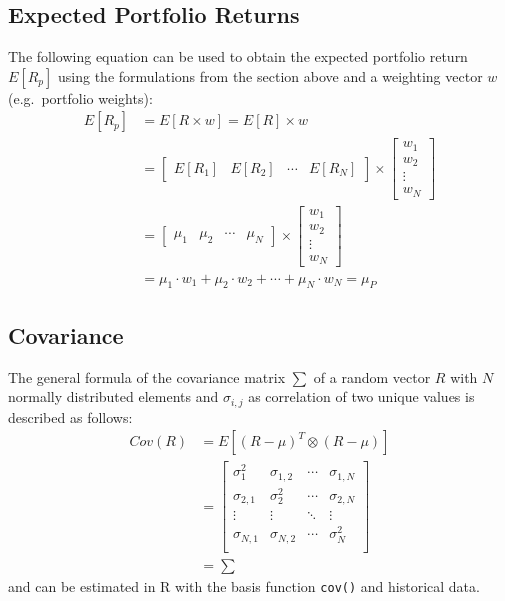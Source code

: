 \documentclass[
  oneside]{book}
\begin{document}
\hypertarget{expected-portfolio-returns}{%
\subsection{Expected Portfolio Returns}\label{expected-portfolio-returns}}

The following equation can be used to obtain the expected portfolio return \(E[R_p]\) using the formulations from the section above and a weighting vector \(w\) (e.g.~portfolio weights):
\begin{align*}
E[R_p] &=
 E[R \times w] = 
 E[R] \times w \\
 &= 
  \begin{bmatrix}
    E[R_{1}] & E[R_{2}] & \cdots & E[R_{N}]
 \end{bmatrix}
  \times 
  \begin{bmatrix}
    w_{1} \\ 
    w_{2} \\
    \vdots \\
    w_{N}  
 \end{bmatrix} \\
 &=
   \begin{bmatrix}
    \mu_{1} & \mu_{2} & \cdots & \mu_{N}
 \end{bmatrix}
  \times 
  \begin{bmatrix}
    w_{1} \\ 
    w_{2} \\
    \vdots \\
    w_{N}  
 \end{bmatrix} \\
 &=
 \mu_{1} \cdot w_1 + \mu_{2} \cdot w_2 + \cdots + \mu_{N} \cdot w_{N} 
 =
 \mu_P
\end{align*}

\hypertarget{covariance}{%
\subsection{Covariance}\label{covariance}}

The general formula of the covariance matrix \(\textstyle\sum\) of a random vector \(R\) with \(N\) normally distributed elements and \(\sigma_{i,j}\) as correlation of two unique values is described as follows:
\begin{align*}
  Cov(R) &= E[(R-\mu)^T \otimes (R-\mu)] \\
  &=   \begin{bmatrix}
    \sigma_1^2 & \sigma_{1,2} & \cdots & \sigma_{1,N} \\
    \sigma_{2, 1} & \sigma_2^2 & \cdots & \sigma_{2, N} \\
    \vdots  & \vdots & \ddots & \vdots \\
    \sigma_{N, 1} & \sigma_{N, 2} & \cdots & \sigma_N^2 \\
 \end{bmatrix}\\
  &=\textstyle\sum
\end{align*}
and can be estimated in R with the basis function \texttt{cov()} and historical data.
\end{document}
